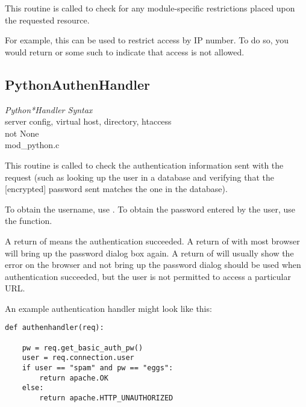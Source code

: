 This routine is called to check for any module-specific restrictions
placed upon the requested resource.

For example, this can be used to restrict access by IP number. To do
so, you would return  or some such to indicate
that access is not allowed.

\subsection{PythonAuthenHandler\label{dir-handlers-auh}}

\emph{Python*Handler Syntax}\\
server config, virtual host, directory, htaccess\\
not None\\
mod_python.c

This routine is called to check the authentication information sent
with the request (such as looking up the user in a database and
verifying that the [encrypted] password sent matches the one in the
database).

To obtain the username, use . To obtain the
password entered by the user, use the 
function.

A return of  means the authentication succeeded. A
return of  with most browser will bring
up the password dialog box again. A return of
 will usually show the error on the
browser and not bring up the password dialog
 should be used when authentication
succeeded, but the user is not permitted to access a particular URL.

An example authentication handler might look like this: 

\begin{verbatim}
def authenhandler(req):

    pw = req.get_basic_auth_pw()
    user = req.connection.user     
    if user == "spam" and pw == "eggs":
        return apache.OK
    else:
        return apache.HTTP_UNAUTHORIZED
\end{verbatim}    

